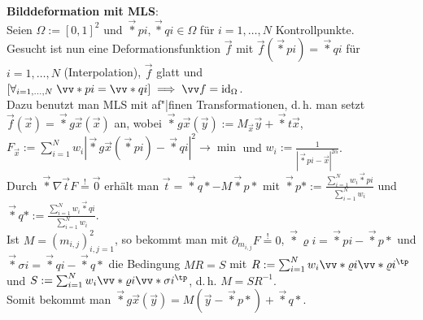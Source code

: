 \linie

\textbf{Bilddeformation mit MLS}:\\
Seien $\Omega := [0, 1]^2$ und $\vec*{p}{i}, \vec*{q}{i} \in \Omega$
für $i = 1, \dotsc, N$ Kontrollpunkte.\\
Gesucht ist nun eine Deformationsfunktion $\vec{f}$ mit
$\vec{f}(\vec*{p}{i}) = \vec*{q}{i}$ für $i = 1, \dotsc, N$ (Interpolation),
$\vec{f}$ glatt und
$[\forall_{i=1,\dotsc,N}\; \vec*{p}{i} = \vec*{q}{i}] \implies \vec{f} = \id_\Omega$.\\
Dazu benutzt man MLS mit af"|finen Transformationen, d.\,h. man setzt
$\vec{f}(\vec{x}) = \vec*{g}{\vec{x}}(\vec{x})$ an,
wobei $\vec*{g}{\vec{x}}(\vec{y}) := M_{\vec{x}} \vec{y} + \vec*{t}{\vec{x}}$,
$F_{\vec{x}} := \sum_{i=1}^N w_i |\vec*{g}{\vec{x}}(\vec*{p}{i}) - \vec*{q}{i}|^2 \to \min$ und
$w_i := \frac{1}{|\vec*{p}{i} - \vec{x}|^{2\alpha}}$.\\
Durch $\vec*{\nabla}{\vec{t}} F \overset{!}{=} \vec{0}$
erhält man $\vec{t} = \vec*{q}{\ast} - M\vec*{p}{\ast}$ mit
$\vec*{p}{\ast} := \frac{\sum_{i=1}^N w_i\vec*{p}{i}}{\sum_{i=1}^N w_i}$ und
$\vec*{q}{\ast} := \frac{\sum_{i=1}^N w_i\vec*{q}{i}}{\sum_{i=1}^N w_i}$.\\
Ist $M = (m_{i,j})_{i,j=1}^2$, so bekommt man mit $\partial_{m_{i,j}} F \overset{!}{=} 0$,
$\vec*{\varrho}{i} = \vec*{p}{i} - \vec*{p}{\ast}$ und
$\vec*{\sigma}{i} = \vec*{q}{i} - \vec*{q}{\ast}$ die Bedingung
$MR = S$ mit
$R := \sum_{i=1}^N w_i \vec*{\varrho}{i} \vec*{\varrho}{i}^\tp$ und
$S := \sum_{i=1}^N w_i \vec*{\varrho}{i} \vec*{\sigma}{i}^\tp$,
d.\,h. $M = SR^{-1}$.\\
Somit bekommt man $\vec*{g}{\vec{x}}(\vec{y}) = M(\vec{y} - \vec*{p}{\ast}) + \vec*{q}{\ast}$.

\pagebreak
{}
